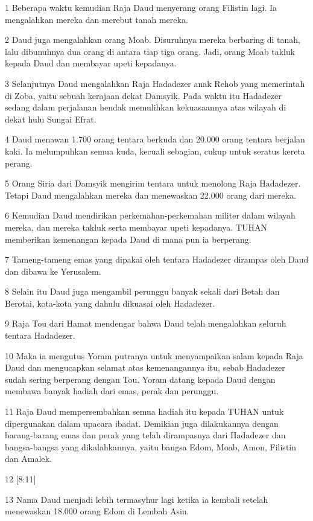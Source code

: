 \par 1 Beberapa waktu kemudian Raja Daud menyerang orang Filistin lagi. Ia mengalahkan mereka dan merebut tanah mereka.
\par 2 Daud juga mengalahkan orang Moab. Disuruhnya mereka berbaring di tanah, lalu dibunuhnya dua orang di antara tiap tiga orang. Jadi, orang Moab takluk kepada Daud dan membayar upeti kepadanya.
\par 3 Selanjutnya Daud mengalahkan Raja Hadadezer anak Rehob yang memerintah di Zoba, yaitu sebuah kerajaan dekat Damsyik. Pada waktu itu Hadadezer sedang dalam perjalanan hendak memulihkan kekuasaannya atas wilayah di dekat hulu Sungai Efrat.
\par 4 Daud menawan 1.700 orang tentara berkuda dan 20.000 orang tentara berjalan kaki. Ia melumpuhkan semua kuda, kecuali sebagian, cukup untuk seratus kereta perang.
\par 5 Orang Siria dari Damsyik mengirim tentara untuk menolong Raja Hadadezer. Tetapi Daud mengalahkan mereka dan menewaskan 22.000 orang dari mereka.
\par 6 Kemudian Daud mendirikan perkemahan-perkemahan militer dalam wilayah mereka, dan mereka takluk serta membayar upeti kepadanya. TUHAN memberikan kemenangan kepada Daud di mana pun ia berperang.
\par 7 Tameng-tameng emas yang dipakai oleh tentara Hadadezer dirampas oleh Daud dan dibawa ke Yerusalem.
\par 8 Selain itu Daud juga mengambil perunggu banyak sekali dari Betah dan Berotai, kota-kota yang dahulu dikuasai oleh Hadadezer.
\par 9 Raja Tou dari Hamat mendengar bahwa Daud telah mengalahkan seluruh tentara Hadadezer.
\par 10 Maka ia mengutus Yoram putranya untuk menyampaikan salam kepada Raja Daud dan mengucapkan selamat atas kemenangannya itu, sebab Hadadezer sudah sering berperang dengan Tou. Yoram datang kepada Daud dengan membawa banyak hadiah dari emas, perak dan perunggu.
\par 11 Raja Daud mempersembahkan semua hadiah itu kepada TUHAN untuk dipergunakan dalam upacara ibadat. Demikian juga dilakukannya dengan barang-barang emas dan perak yang telah dirampasnya dari Hadadezer dan bangsa-bangsa yang dikalahkannya, yaitu bangsa Edom, Moab, Amon, Filistin dan Amalek.
\par 12 [8:11]
\par 13 Nama Daud menjadi lebih termasyhur lagi ketika ia kembali setelah menewaskan 18.000 orang Edom di Lembah Asin.

